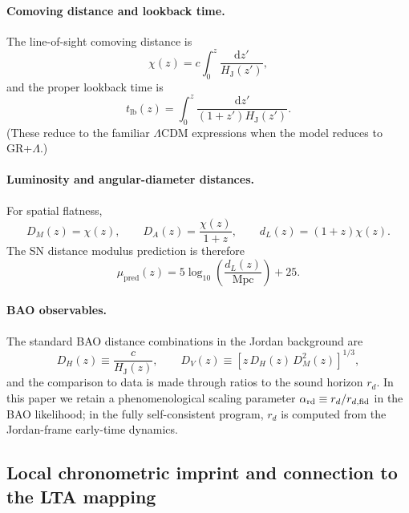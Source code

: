 \documentclass[10pt]{article}
\newcommand{\chis}{\chi}
\newcommand{\Mpc}{\mathrm{Mpc}}
\newcommand{\tlb}{t_{\mathrm{lb}}}
\providecommand{\dd}{\mathrm{d}}
\newcommand{\HJ}{H_{\mathrm{J}}}
\begin{document}
\paragraph{Comoving distance and lookback time.}
The line-of-sight comoving distance is
\begin{equation}
\chis(z) = c\int_0^{z}\frac{\dd z'}{\HJ(z')},
\label{eq:chi_def}
\end{equation}
and the proper lookback time is
\begin{equation}
\tlb(z) = \int_0^{z}\frac{\dd z'}{(1+z')\HJ(z')}.
\label{eq:tlb_def}
\end{equation}
(These reduce to the familiar $\Lambda$CDM expressions when the model reduces to GR+$\Lambda$.)

\paragraph{Luminosity and angular-diameter distances.}
For spatial flatness,
\begin{equation}
D_M(z)=\chis(z),
\qquad
D_A(z)=\frac{\chis(z)}{1+z},
\qquad
d_L(z)=(1+z)\chis(z).
\label{eq:distances_J}
\end{equation}
The SN distance modulus prediction is therefore
\begin{equation}
\mu_{\mathrm{pred}}(z) = 5\log_{10}\!\left(\frac{d_L(z)}{\Mpc}\right)+25.
\label{eq:mu_pred_J}
\end{equation}

\paragraph{BAO observables.}
The standard BAO distance combinations in the Jordan background are
\begin{equation}
D_H(z)\equiv \frac{c}{\HJ(z)},
\qquad
D_V(z)\equiv \left[z\,D_H(z)\,D_M^2(z)\right]^{1/3},
\label{eq:bao_defs_J}
\end{equation}
and the comparison to data is made through ratios to the sound horizon $r_d$.
In this paper we retain a phenomenological scaling parameter $\alpha_{\rm rd}\equiv r_d/r_{d,\rm fid}$
in the BAO likelihood; in the fully self-consistent program, $r_d$ is computed from the
Jordan-frame early-time dynamics.

\subsection{Local chronometric imprint and connection to the LTA mapping}
\label{sec:lta_mapping}
\end{document}
